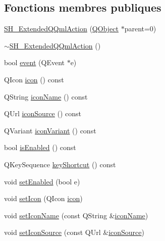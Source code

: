 \subsection*{Fonctions membres publiques}
\begin{DoxyCompactItemize}
\item 
\hyperlink{classSH__ExtendedQQmlAction_aaecd8af53387938e1d1478f7c1c8f566}{S\-H\-\_\-\-Extended\-Q\-Qml\-Action} (\hyperlink{classQObject}{Q\-Object} $\ast$parent=0)
\item 
\hyperlink{classSH__ExtendedQQmlAction_a03c5eae20747d7a8b444c7939d2ab262}{$\sim$\-S\-H\-\_\-\-Extended\-Q\-Qml\-Action} ()
\item 
bool \hyperlink{classSH__ExtendedQQmlAction_a218053d85e9fc54e06ab39b1bb37dd4b}{event} (Q\-Event $\ast$e)
\item 
Q\-Icon \hyperlink{classSH__ExtendedQQmlAction_a1ad6dd5cce1909ac371f70b5bc57d927}{icon} () const 
\item 
Q\-String \hyperlink{classSH__ExtendedQQmlAction_afaa301943c53a8689ec5447560ffc97f}{icon\-Name} () const 
\item 
Q\-Url \hyperlink{classSH__ExtendedQQmlAction_a4256635783087124d3df6fa9726e7d55}{icon\-Source} () const 
\item 
Q\-Variant \hyperlink{classSH__ExtendedQQmlAction_a53e1244ef9cc77483684fdf57c236c76}{icon\-Variant} () const 
\item 
bool \hyperlink{classSH__ExtendedQQmlAction_a4da1f74b1aa64958ea18b2b55648b7db}{is\-Enabled} () const 
\item 
Q\-Key\-Sequence \hyperlink{classSH__ExtendedQQmlAction_a2efb60c1b33a04e8e58ef9184dccbd2d}{key\-Shortcut} () const 
\item 
void \hyperlink{classSH__ExtendedQQmlAction_aff39518e3dbf185d6b91f827521fa358}{set\-Enabled} (bool e)
\item 
void \hyperlink{classSH__ExtendedQQmlAction_aca3c862c9092a2cd7c2098f2132b0a45}{set\-Icon} (Q\-Icon \hyperlink{classSH__ExtendedQQmlAction_a1ad6dd5cce1909ac371f70b5bc57d927}{icon})
\item 
void \hyperlink{classSH__ExtendedQQmlAction_a348526d65cd47b4ea6378e2a62065135}{set\-Icon\-Name} (const Q\-String \&\hyperlink{classSH__ExtendedQQmlAction_a9107464c9df5a0ae59acd8ccbea7328a}{icon\-Name})
\item 
void \hyperlink{classSH__ExtendedQQmlAction_ae34fe314ba335d65d99932b27f1404f7}{set\-Icon\-Source} (const Q\-Url \&\hyperlink{classSH__ExtendedQQmlAction_a569753d493f0ddc2fc0929e35268b4ff}{icon\-Source})
\item 

\end{DoxyCompactItemize}
